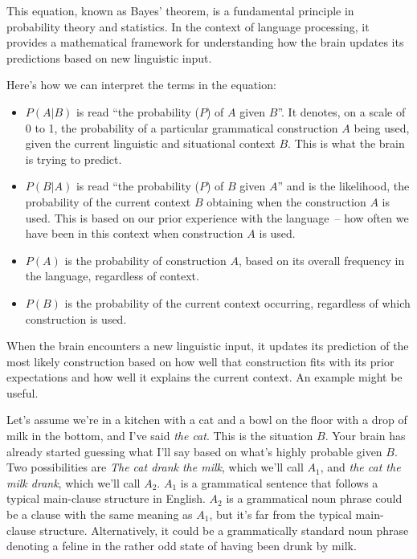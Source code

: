 This equation, known as Bayes' theorem, is a fundamental principle in probability theory and statistics. In the context of language processing, it provides a mathematical framework for understanding how the brain updates its predictions based on new linguistic input.

Here's how we can interpret the terms in the equation:

\begin{itemize}
    \item $P(A|B)$ is read ``the probability ($P$) of $A$ given $B$''. It denotes, on a scale of 0 to 1, the probability of a particular grammatical construction $A$ being used, given the current linguistic and situational context $B$. This is what the brain is trying to predict.
    \item $P(B|A)$ is read ``the probability ($P$) of $B$ given $A$'' and is the likelihood, the probability of the current context $B$ obtaining when the construction $A$ is used. This is based on our prior experience with the language~-- how often we have been in this context when construction $A$ is used.
    \item $P(A)$ is the probability of construction $A$, based on its overall frequency in the language, regardless of context.
    \item $P(B)$ is the probability of the current context occurring, regardless of which construction is used.
\end{itemize}

When the brain encounters a new linguistic input, it updates its prediction of the most likely construction based on how well that construction fits with its prior expectations and how well it explains the current context. An example might be useful.

Let's assume we're in a kitchen with a cat and a bowl on the floor with a drop of milk in the bottom, and I've said \textit{the cat}. This is the situation $B$. Your brain has already started guessing what I'll say based on what's highly probable given $B$. Two possibilities are \textit{The cat drank the milk}, which we'll call $A_1$, and \textit{the cat the milk drank}, which we'll call $A_2$. $A_1$ is a grammatical sentence that follows a typical main-clause structure in English. $A_2$ is a grammatical noun phrase could be a clause with the same meaning as $A_1$, but it's far from the typical main-clause structure. Alternatively, it could be a grammatically standard noun phrase denoting a feline in the rather odd state of having been drunk by milk.

